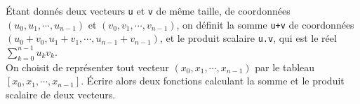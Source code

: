 \exer{}
\setcounter{numques}{0}

Étant donnés deux vecteurs \texttt{u} et \texttt{v} de même taille, de
coordonnées $( u_0,u_1,\cdots,u_{n-1})$ et
$(v_0,v_1,\cdots,v_{n-1})$, on définit la somme
\texttt{u+v} de coordonnées $(u_0+v_0,u_1+v_1,\cdots,u_{n-1}+v_{n-1})$, et le
produit scalaire \texttt{u.v}, qui est le réel
$\displaystyle\sum_{k=0}^{n-1}u_kv_k$.\\
On choisit de représenter tout vecteur $(x_0,x_1,\cdots,x_{n-1})$ par le tableau
\texttt{$[x_0,x_1,\cdots,x_{n-1}]$}. Écrire alors deux fonctions calculant la
somme et le produit scalaire de deux vecteurs.